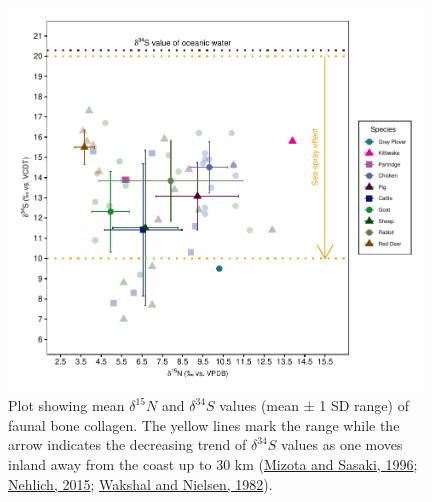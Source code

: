 \documentclass[preprint, 3p, authoryear]{elsarticle} %
\begin{document}
\begin{figure}
\includegraphics[width=0.98\textwidth]{RPaladugu_Castro_files/figure-latex/fauna-sulph-iso-plot-1} \caption{Plot showing mean \(\delta ^{15}N\) and \(\delta ^{34}S\) values (mean ± 1 SD range) of faunal bone collagen. The yellow lines mark the range while the arrow indicates the decreasing trend of \(\delta ^{34}S\) values as one moves inland away from the coast up to 30 km (\protect\hyperlink{ref-mizota_sasaki96}{Mizota and Sasaki, 1996}; \protect\hyperlink{ref-nehlich15}{Nehlich, 2015}; \protect\hyperlink{ref-wakshal_nielsen82}{Wakshal and Nielsen, 1982}).}\label{fig:fauna-sulph-iso-plot}
\end{figure}
\end{document}
